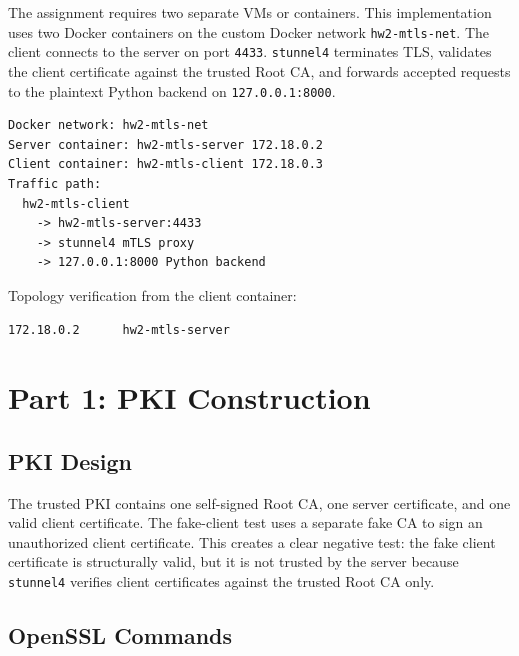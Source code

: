 \documentclass[11pt]{article}
\begin{document}
The assignment requires two separate VMs or containers. This implementation uses two Docker containers on the custom Docker network \texttt{hw2-mtls-net}. The client connects to the server on port \texttt{4433}. \texttt{stunnel4} terminates TLS, validates the client certificate against the trusted Root CA, and forwards accepted requests to the plaintext Python backend on \texttt{127.0.0.1:8000}.

\begin{lstlisting}
Docker network: hw2-mtls-net
Server container: hw2-mtls-server 172.18.0.2
Client container: hw2-mtls-client 172.18.0.3
Traffic path:
  hw2-mtls-client
    -> hw2-mtls-server:4433
    -> stunnel4 mTLS proxy
    -> 127.0.0.1:8000 Python backend
\end{lstlisting}

Topology verification from the client container:

\begin{lstlisting}
172.18.0.2      hw2-mtls-server
\end{lstlisting}

\section{Part 1: PKI Construction}

\subsection*{PKI Design}

The trusted PKI contains one self-signed Root CA, one server certificate, and one valid client certificate. The fake-client test uses a separate fake CA to sign an unauthorized client certificate. This creates a clear negative test: the fake client certificate is structurally valid, but it is not trusted by the server because \texttt{stunnel4} verifies client certificates against the trusted Root CA only.

\subsection*{OpenSSL Commands}
\end{document}
